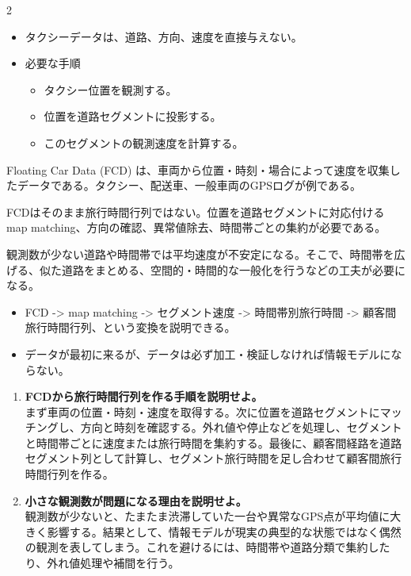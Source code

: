 \clearpage
{}
\begin{multicols}{2}\footnotesize\raggedcolumns
{}
\begin{itemize}
\item タクシーデータは、道路、方向、速度を直接与えない。
\item 必要な手順
\begin{itemize}
\item タクシー位置を観測する。
\item 位置を道路セグメントに投影する。
\item このセグメントの観測速度を計算する。
\end{itemize}
\end{itemize}
Floating Car Data (FCD) は、車両から位置・時刻・場合によって速度を収集したデータである。タクシー、配送車、一般車両のGPSログが例である。\par

FCDはそのまま旅行時間行列ではない。位置を道路セグメントに対応付ける map matching、方向の確認、異常値除去、時間帯ごとの集約が必要である。\par

観測数が少ない道路や時間帯では平均速度が不安定になる。そこで、時間帯を広げる、似た道路をまとめる、空間的・時間的な一般化を行うなどの工夫が必要になる。\par
{}
\begin{itemize}
\item FCD -> map matching -> セグメント速度 -> 時間帯別旅行時間 -> 顧客間旅行時間行列、という変換を説明できる。
\item データが最初に来るが、データは必ず加工・検証しなければ情報モデルにならない。
\end{itemize}
\begin{enumerate}
\item \textbf{FCDから旅行時間行列を作る手順を説明せよ。}\\まず車両の位置・時刻・速度を取得する。次に位置を道路セグメントにマッチングし、方向と時刻を確認する。外れ値や停止などを処理し、セグメントと時間帯ごとに速度または旅行時間を集約する。最後に、顧客間経路を道路セグメント列として計算し、セグメント旅行時間を足し合わせて顧客間旅行時間行列を作る。
\item \textbf{小さな観測数が問題になる理由を説明せよ。}\\観測数が少ないと、たまたま渋滞していた一台や異常なGPS点が平均値に大きく影響する。結果として、情報モデルが現実の典型的な状態ではなく偶然の観測を表してしまう。これを避けるには、時間帯や道路分類で集約したり、外れ値処理や補間を行う。
\end{enumerate}
\end{multicols}

